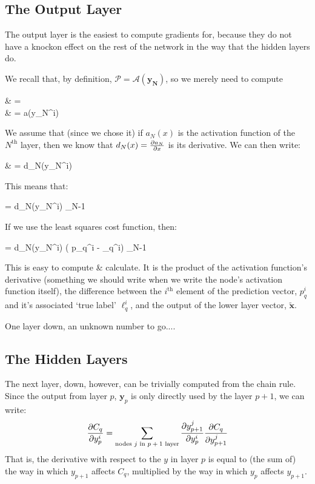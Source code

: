 \documentclass[a4paper,openany,11pt]{book}
\newcommand\cec[1]{\tilde{\vec{#1}}}
\renewcommand\vec[1]{\boldsymbol{\mathbf{#1}}}
\begin{document}
			\subsection{The Output Layer}

				The output layer is the easiest to compute gradients for, because they do not have a knockon effect on the rest of the network in the way that the hidden layers do.

					We recall that, by definition, $\mathcal{P} = \mathcal{A}(\vec{y_{N}})$, so we merely need to compute
				\begin{spalign}
					 & =  \times {}
					\\
					& =   a(y_N^i)
				\end{spalign}
			We assume that (since we chose it) if $a_N(x)$ is the activation function of the $N^\text{th}$ layer, then we know that $d_N(x) = \frac{\partial a_N}{\partial x}$ is its derivative. We can then write:
			\begin{spalign}
				 & =  \times d_N(y_N^i)
			\end{spalign}

			This means that:
			\begin{spalign}
				\pdiv{C_q}{\vec{w}_\ell^i} = d_N(y_N^i) \cec{x}_{N-1}
			\end{spalign}

			If we use the least squares cost function, then:
			\begin{spalign}
				\pdiv{C_q}{\vec{w}_\ell^i} = d_N(y_N^i) \times \left( p_q^i - \ell_q^i\right) \cec{x}_{N-1}
			\end{spalign}


				
			This is easy to compute \& calculate. It is the product of the activation function's derivative (something we should write when we write the node's activation function itself), the difference between the $i^\text{th}$ element of the prediction vector, $p_q^i$ and it's associated `true label' $\ell_q^i$, and the output of the lower layer vector, $\cec{x}$. 
			
			
			One layer down, an unknown number to go....

			\subsection{The Hidden Layers}
			The next layer, down, however, can be trivially computed from the chain rule. Since the output from layer $p$, $\vec{y}_p$ is only directly used by the layer $p+1$, we can write:
			\begin{equation}
				\frac{\partial C_q}{\partial y_p^i} = \sum_{\text{nodes $j$ in $p+1$ layer}} \frac{\partial y_{p+1}^j}{\partial y_p^i} \frac{\partial C_q}{\partial y_{p+1}^j}
			\end{equation}
			That is, the derivative with respect to the $y$ in layer $p$ is equal to (the sum of) the way in which $y_{p+1}$ affects $C_q$, multiplied by the way in which $y_p$ affects $y_{p+1}$. 
\end{document}
